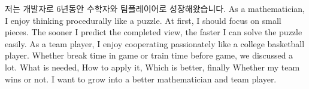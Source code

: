 

\begin{cvparagraph}

저는 개발자로 6년동안 수학자와 팀플레이어로 성장해왔습니다.
As a mathematician, I enjoy thinking procedurally like a puzzle.
At first, I should focus on small pieces.
The sooner I predict the completed view, the faster I can solve the puzzle easily.
As a team player, I enjoy cooperating passionately like a college basketball player.
Whether break time in game or train time before game, we discussed a lot.
What is needed, How to apply it, Which is better, finally Whether my team wins or not.
I want to grow into a better mathematician and team player.
\end{cvparagraph}
